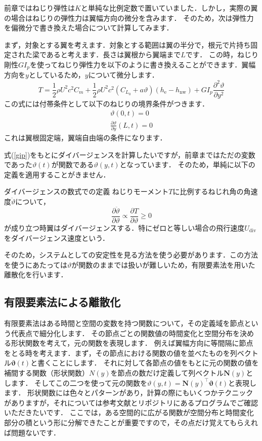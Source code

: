 \documentclass{jarticle}
\begin{document}
前章ではねじり弾性は$K$と単純な比例定数で置いていました．しかし，実際の翼の場合はねじりの弾性力は翼幅方向の微分を含みます．
そのため，次は弾性力を偏微分で書き換えた場合について計算してみます．

まず，対象とする翼を考えます．対象とする範囲は翼の半分で，根元で片持ち固定された梁であると考えます．長さは翼根から翼端まで$L$です．
この時，ねじり剛性$GI_p$を使ってねじり弾性力を以下のように書き換えることができます．翼幅方向を$y$としているため，$y$について微分します．
\begin{equation} \label{gip}
    T = \frac{1}{2}\rho U^2 c^2 C_m + \frac{1}{2}\rho U^2 c^2 (C_{L_0} + a\vartheta)  (h_\mathrm{e}-h_\mathrm{nw}) + GI_p \frac{\partial^2 \vartheta}{\partial y^2}
\end{equation}
この式には付帯条件として以下のねじりの境界条件がつきます．
\begin{align}
    \vartheta(0,t) = 0 \\
    \frac{\partial \vartheta}{\partial y}(L,t) = 0
\end{align}
これは翼根固定端，翼端自由端の条件になります．

式(\ref{gip})をもとにダイバージェンスを計算したいですが，前章まではただの変数であった$\vartheta(t)$が関数である$\vartheta(y,t)$となっています．
そのため，単純に以下の定義を適用することがきません．
\begin{itembox}[l]{ダイバージェンスの数式での定義}
    ねじりモーメント$T$に比例するねじれ角の角速度$\ddot{\vartheta}$について，
    \begin{equation*}
        \frac{\partial \ddot{\vartheta}}{\partial \vartheta} \propto \frac{\partial T}{\partial \vartheta} \geq 0
    \end{equation*}
    が成り立つ時翼はダイバージェンスする．特にゼロと等しい場合の飛行速度$U_\mathrm{div}$をダイバージェンス速度という．
\end{itembox}
そのため，システムとしての安定性を見る方法を使う必要があります．この方法を使うにあたっては$\vartheta$が関数のままでは扱いが難しいため，有限要素法を用いた離散化を行います．

\subsection{有限要素法による離散化}

有限要素法はある時間と空間の変数を持つ関数について，その定義域を節点という代表点で細分化します．
その節点ごとの関数値の時間変化と空間分布を決める形状関数を考えて，元の関数を表現します．
例えば翼幅方向に等間隔に節点をとる時を考えます．まず，その節点における関数の値を並べたものを列ベクトル$\bm{\vartheta}(t)$と書くことにします．
それに対して各節点の値をもとに元の関数の値を補間する関数（形状関数）$N(y)$を節点の数だけ定義して列ベクトル$\bm{N}(y)$とします．
そしてこの二つを使って元の関数を$\vartheta(y,t) = \bm{N}(y)^\top\bm{\vartheta}(t)$と表現します．
形状関数には色々とパターンがあり，計算の際にもいくつかテクニックがありますが，それについては参考文献とリポジトリにあるプログラムでご確認いただきたいです．
ここでは，ある空間的に広がる関数が空間分布と時間変化部分の積という形に分解できたことが重要ですので，その点だけ覚えてもらえれば問題ないです．
\end{document}
